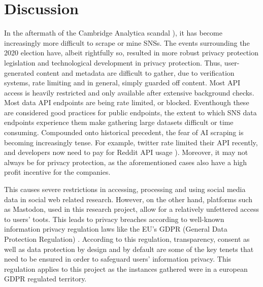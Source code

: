 \section{Discussion}
In the aftermath of the Cambridge Analytica scandal \cite{cambridge}), it has become increasingly more difficult to scrape or mine SNSs.
The events surrounding the 2020 election have, albeit rightfully so, resulted in more robust privacy protection legislation and technological development in privacy protection.
Thus, user-generated content and metadata are difficult to gather, due to verification systems, rate limiting and in general, simply guarded off content. 
Most API access is heavily restricted and only available after extensive background checks.
Most data API endpoints are being rate limited, or blocked.
Eventhough these are considered good practices for public endpoints, the extent to which SNS data endpoints experience them make gathering large datasets difficult or time consuming.
Compounded onto historical precedent, the fear of AI scraping is becoming increasingly tense.
For example, twitter rate limited their API \cite{Twitter} recently, and developers now need to pay for Reddit API usage \cite{reddit}).
Moreover, it may not always be for privacy protection, as the aforementioned cases also have a high profit incentive for the companies.

This causes severe restrictions in accessing, processing and using social media data in social web related research. However, on the other hand, platforms such as Mastodon, used in this research project, allow for a relatively unfettered access to users' toots. This leads to privacy breaches according to well-known information privacy regulation laws like the EU's GDPR (General Data Protection Regulation) \cite{gdpr}. According to this regulation, transparency, consent as well as data protection by design and by default are some of the key tenets that need to be ensured in order to safeguard users' information privacy. This regulation applies to this project as the instances gathered were in a european GDPR regulated territory. 

